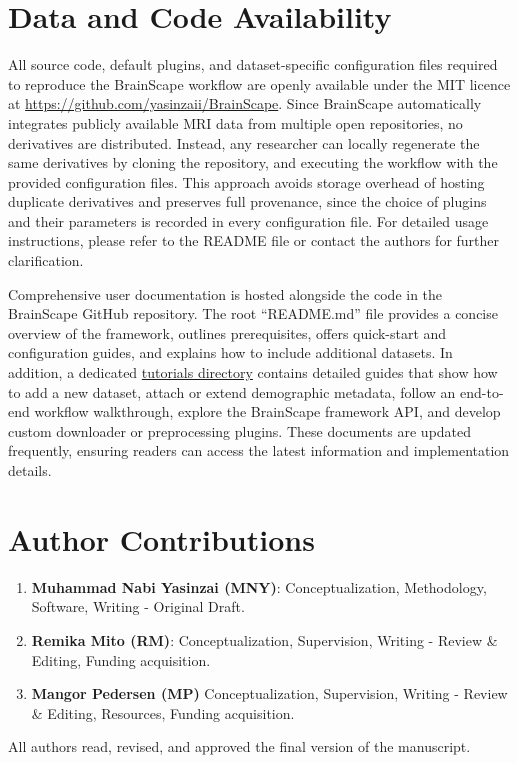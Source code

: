 \section*{Data and Code Availability}

All source code, default plugins, and dataset-specific configuration files required 
to reproduce the BrainScape workflow are openly available under the MIT licence at 
\url{https://github.com/yasinzaii/BrainScape}. Since BrainScape automatically integrates 
publicly available MRI data from multiple open repositories, no derivatives are distributed. 
Instead, any researcher can locally regenerate the same derivatives by cloning the repository, 
and executing the workflow with the provided configuration files. 
This approach avoids storage overhead of hosting duplicate derivatives 
and preserves full provenance, since the choice of plugins and their parameters is recorded 
in every configuration file. 
For detailed usage instructions, please refer to the README file or contact the authors for further clarification.

Comprehensive user documentation is hosted alongside the code in the BrainScape GitHub repository. 
The root ``README.md'' file provides a concise overview of the framework, outlines prerequisites, 
offers quick-start and configuration guides, and explains how to include additional datasets. 
In addition, a dedicated \href{https://github.com/yasinzaii/BrainScape/tree/main/tutorials}{tutorials directory} 
contains detailed guides that show how to add a new dataset, attach or extend demographic metadata, 
follow an end-to-end workflow walkthrough, explore the BrainScape framework API, 
and develop custom downloader or preprocessing plugins. 
These documents are updated frequently, 
ensuring readers can access the latest information and implementation details.



\section*{Author Contributions}

\begin{enumerate}
    \item \textbf{Muhammad Nabi Yasinzai (MNY)}: Conceptualization, Methodology, Software, Writing - Original Draft.
    \item \textbf{Remika Mito (RM)}: Conceptualization, Supervision, Writing - Review \& Editing, Funding acquisition. 
    \item \textbf{Mangor Pedersen (MP)} Conceptualization, Supervision, Writing - Review \& Editing, Resources, Funding acquisition. 
\end{enumerate}
All authors read, revised, and approved the final version of the manuscript.


